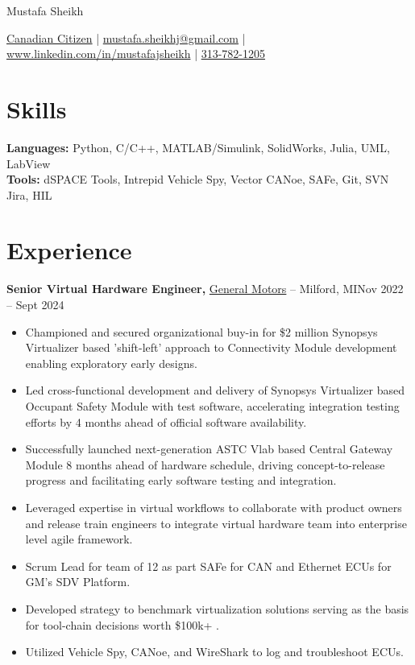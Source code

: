 \documentclass[11pt]{article}       %
\begin{document}
\centerline{\Huge Mustafa Sheikh}

\vspace{5pt}

\centerline{\href{}{Canadian Citizen} | \href{mailto:mustafa.sheikhj@gmail.com}{mustafa.sheikhj@gmail.com} | \href{wwww.linkedin.com/in/mustafajsheikh}{www.linkedin.com/in/mustafajsheikh} | \href{}{313-782-1205}}

\vspace{-10pt}

\section*{Skills}
\textbf{Languages:} Python, C/C++, MATLAB/Simulink, SolidWorks, Julia, UML, LabView \\
\textbf{Tools:} dSPACE Tools, Intrepid Vehicle Spy, Vector CANoe, SAFe, Git, SVN Jira, HIL \\

\vspace{-6.5pt}

\section*{Experience}
\textbf{Senior Virtual Hardware Engineer,} \href{}{General Motors} -- Milford, MI\hfill Nov 2022 -- Sept 2024\\
\vspace{-9pt}
\begin{itemize}
  \item Championed and secured organizational buy-in for \$2 million Synopsys Virtualizer based 'shift-left' approach to Connectivity Module development enabling exploratory early designs.
  \item Led cross-functional development and delivery of Synopsys Virtualizer based Occupant Safety Module with test software, accelerating integration testing efforts by 4 months ahead of official software availability.
  \item Successfully launched next-generation ASTC Vlab based Central Gateway Module 8 months ahead of hardware schedule, driving concept-to-release progress and facilitating early software testing and integration.
  \item Leveraged expertise in virtual workflows to collaborate with product owners and release train engineers to integrate virtual hardware team into enterprise level agile framework.
  \item Scrum Lead for team of 12 as part SAFe for CAN and Ethernet ECUs for GM’s SDV Platform.
  \item Developed strategy to benchmark virtualization solutions serving as the basis for tool-chain decisions worth \$100k+ .
  \item Utilized Vehicle Spy, CANoe, and WireShark to log and troubleshoot ECUs.
\end{itemize}
\end{document}
